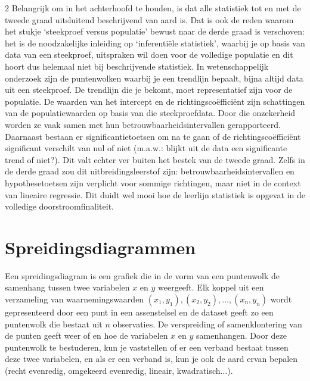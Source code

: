 \begin{multicols}{2}
Belangrijk om in het achterhoofd te houden, is dat alle statistiek tot en met de tweede graad uitsluitend beschrijvend van aard is. Dat is ook de reden waarom het stukje `steekproef versus populatie' bewust naar de derde graad is verschoven: het is de noodzakelijke inleiding op `inferentiële statistiek', waarbij je op basis van data van een steekproef, uitspraken wil doen voor de volledige populatie en dit hoort dus helemaal niet bij beschrijvende statistiek. In wetenschappelijk onderzoek zijn de puntenwolken waarbij je een trendlijn bepaalt, bijna altijd data uit een steekproef. De trendlijn die je bekomt, moet representatief zijn voor de populatie. De waarden van het intercept en de richtingscoëfficiënt zijn schattingen van de populatiewaarden op basis van die steekproefdata. Door die onzekerheid worden ze vaak samen met hun betrouwbaarheidsintervallen gerapporteerd. Daarnaast bestaan er significantietoetsen om na te gaan of de richtingscoëfficiënt significant verschilt van nul of niet (m.a.w.: blijkt uit de data een significante trend of niet?). Dit valt echter ver buiten het bestek van de tweede graad. Zelfs in de derde graad zou dit uitbreidingsleerstof zijn: betrouwbaarheidsintervallen en hypothesetoetsen zijn verplicht voor sommige richtingen, maar niet in de context van lineaire regressie. Dit duidt wel mooi hoe de leerlijn statistiek is opgevat in de volledige doorstroomfinaliteit.
	\section{Spreidingsdiagrammen}
Een spreidingsdiagram is een grafiek die in de vorm van een puntenwolk de samenhang tussen twee variabelen $x$ en $y$ weergeeft. Elk koppel uit een verzameling van waarnemingswaarden $(x_1,y_1 ),(x_2,y_2 ),\ldots,(x_n,y_n)$ wordt gepresenteerd door een punt in een assenstelsel en de dataset geeft zo een puntenwolk die bestaat uit $n$ observaties. De verspreiding of samenklontering van de punten geeft weer of en hoe de variabelen $x$ en $y$ samenhangen. Door deze puntenwolk te bestuderen, kun je vaststellen of er een verband bestaat tussen deze twee variabelen, en als er een verband is, kun je ook de aard ervan bepalen (recht evenredig, omgekeerd evenredig, lineair, kwadratisch$\ldots$). 
\end{multicols}

